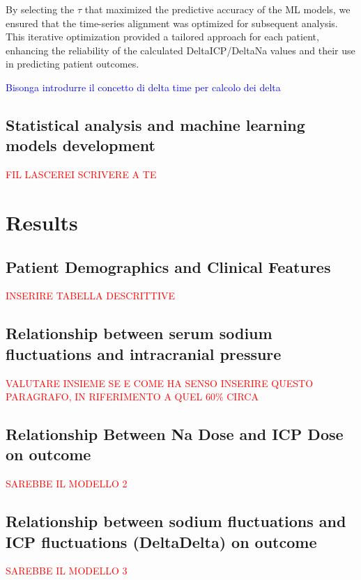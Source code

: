 By selecting the $\tau$ that maximized the predictive accuracy of the ML models, we ensured that the time-series alignment was optimized for subsequent analysis. This iterative optimization provided a tailored approach for each patient, enhancing the reliability of the calculated DeltaICP/DeltaNa values and their use in predicting patient outcomes.


\textcolor{blue}{Bisonga introdurre il concetto di delta time per calcolo dei delta}

\subsection{Statistical analysis and machine learning models development}
\textcolor{red}{FIL LASCEREI SCRIVERE A TE}

\section {Results}
\subsection{Patient Demographics and Clinical Features}
\textcolor{red}{INSERIRE TABELLA DESCRITTIVE}

\subsection{Relationship between serum sodium fluctuations and intracranial pressure}
\textcolor{red}{VALUTARE INSIEME SE E COME HA SENSO INSERIRE QUESTO PARAGRAFO, IN RIFERIMENTO A QUEL 60\% CIRCA}

\subsection{Relationship Between Na Dose and ICP Dose on outcome}
\textcolor{red}{SAREBBE IL MODELLO 2}

\subsection{Relationship between sodium fluctuations and ICP fluctuations (DeltaDelta) on outcome}
\textcolor{red}{SAREBBE IL MODELLO 3}

